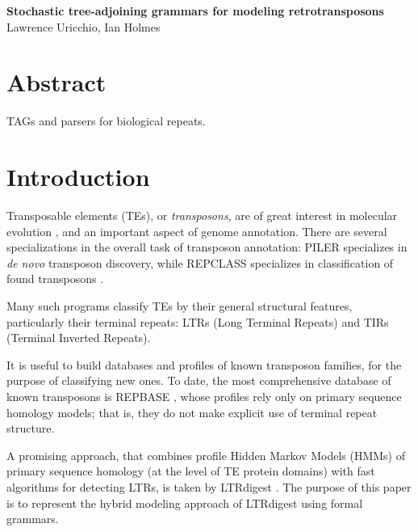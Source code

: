 \documentclass[10pt]{article}
\date{}
\newcommand\titlestring{Stochastic tree-adjoining grammars for modeling retrotransposons}
\newcommand\authorstring{
Lawrence Uricchio, Ian Holmes
}
\begin{document}
\begin{flushleft}
  {\Large
    \textbf{\titlestring}
  }
\\
\authorstring
\end{flushleft}


\section*{Abstract}
TAGs and parsers for biological repeats.

\tableofcontents



\section{Introduction}

Transposable elements (TEs), or {\em transposons}, are of great interest in molecular evolution \cite{Feschotte2007}, and an important aspect of genome annotation.
There are several specializations in the overall task of transposon annotation:
PILER \cite{EdgarMyers2005} specializes in {\em de novo} transposon discovery,
while REPCLASS specializes in classification of found transposons \cite{FeschotteKeswaniEtAl2009}.

Many such programs classify TEs by their general structural features, particularly their terminal repeats:
LTRs (Long Terminal Repeats) and TIRs (Terminal Inverted Repeats).

It is useful to build databases and profiles of known transposon families, for the purpose of classifying new ones.
To date, the most comprehensive database of known transposons is REPBASE \cite{KapitonovJurka2008},
whose profiles rely only on primary sequence homology models;
that is, they do not make explicit use of terminal repeat structure.

A promising approach, that combines profile Hidden Markov Models (HMMs) of primary sequence homology (at the level of TE protein domains)
with fast algorithms for detecting LTRs,
is taken by LTRdigest \cite{pmid19786494}.
The purpose of this paper is to represent the hybrid modeling approach of LTRdigest using formal grammars.
\end{document}
